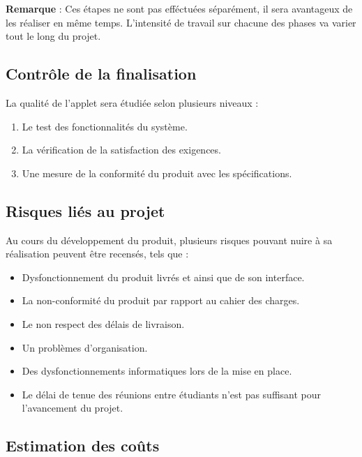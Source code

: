 				\textbf{Remarque} : Ces étapes ne sont pas efféctuées séparément, il sera avantageux de les réaliser en même temps. L'intensité de travail sur chacune des phases va varier tout le long du projet.
				
		\subsection{Contrôle de la finalisation}
			La qualité de l'applet sera étudiée selon plusieurs niveaux :
			\begin{enumerate}
			\item Le test des fonctionnalités du système.
			\item La vérification de la satisfaction des exigences.
			\item Une mesure de la conformité du produit avec les spécifications.
			\end{enumerate}
			
		\subsection{Risques liés au projet}
		Au cours du développement du produit, plusieurs risques pouvant nuire à sa réalisation peuvent être recensés, tels que :
			\begin{itemize}
			\item	Dysfonctionnement du produit livrés et ainsi que de son interface.
			\item	La non-conformité du produit par rapport au cahier des charges.
			\item	Le non respect des délais de livraison.
			\item	Un problèmes d'organisation.
			\item	Des dysfonctionnements informatiques lors de la mise en place.
			\item	Le délai de tenue des réunions entre étudiants n'est pas suffisant pour l'avancement du projet.
			\end{itemize}
						
		\subsection{Estimation des coûts}
		
